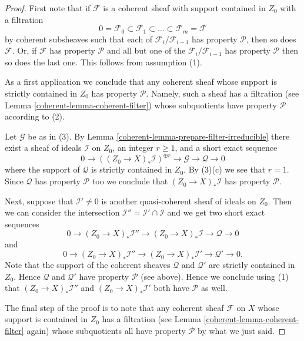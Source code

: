 \begin{proof}

First note that if $\mathcal{F}$ is a coherent sheaf with support
contained in $Z_0$ with a filtration
$$
0 = \mathcal{F}_0 \subset \mathcal{F}_1 \subset
\ldots \subset \mathcal{F}_m = \mathcal{F}
$$
by coherent subsheaves such that each of $\mathcal{F}_i/\mathcal{F}_{i - 1}$
has property $\mathcal{P}$, then so does $\mathcal{F}$. Or, if $\mathcal{F}$
has property $\mathcal{P}$ and all but one of the
$\mathcal{F}_i/\mathcal{F}_{i - 1}$ has property $\mathcal{P}$ then
so does the last one. This follows from assumption (1).

\medskip\noindent
As a first application we conclude that any coherent sheaf whose support
is strictly contained in $Z_0$ has property $\mathcal{P}$. Namely, such a
sheaf has a filtration (see Lemma \ref{coherent-lemma-coherent-filter})
whose subquotients have property $\mathcal{P}$ according to (2).

\medskip\noindent
Let $\mathcal{G}$ be as in (3). By Lemma \ref{coherent-lemma-prepare-filter-irreducible}
there exist a sheaf of ideals $\mathcal{I}$ on $Z_0$, an
integer $r \geq 1$, and a short exact sequence
$$
0 \to
\left((Z_0 \to X)_*\mathcal{I}\right)^{\oplus r} \to
\mathcal{G} \to
\mathcal{Q} \to 0
$$
where the support of $\mathcal{Q}$ is strictly contained in $Z_0$.
By (3)(c) we see that $r = 1$. Since $\mathcal{Q}$ has property $\mathcal{P}$
too we conclude that $(Z_0 \to X)_*\mathcal{I}$ has property
$\mathcal{P}$.

\medskip\noindent
Next, suppose that $\mathcal{I}' \not = 0$ is another quasi-coherent
sheaf of ideals on $Z_0$. Then we can consider the intersection
$\mathcal{I}'' = \mathcal{I}' \cap \mathcal{I}$ and we get
two short exact sequences
$$
0 \to
(Z_0 \to X)_*\mathcal{I}'' \to
(Z_0 \to X)_*\mathcal{I} \to
\mathcal{Q} \to 0
$$
and
$$
0 \to
(Z_0 \to X)_*\mathcal{I}'' \to
(Z_0 \to X)_*\mathcal{I}' \to
\mathcal{Q}' \to 0.
$$
Note that the support of the coherent sheaves $\mathcal{Q}$ and
$\mathcal{Q}'$ are strictly contained in $Z_0$.
Hence $\mathcal{Q}$ and $\mathcal{Q}'$ have property $\mathcal{P}$
(see above). Hence we conclude using (1)
that $(Z_0 \to X)_*\mathcal{I}''$ and $(Z_0 \to X)_*\mathcal{I}'$
both have $\mathcal{P}$ as well.

\medskip\noindent
The final step of the proof is to note that any coherent sheaf
$\mathcal{F}$ on $X$ whose support is contained in $Z_0$ has a filtration
(see Lemma \ref{coherent-lemma-coherent-filter} again) whose subquotients
all have property $\mathcal{P}$ by what we just said.
\end{proof}

